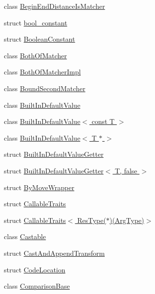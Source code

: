 \begin{DoxyCompactItemize}
\item 
class \hyperlink{classtesting_1_1internal_1_1_begin_end_distance_is_matcher}{Begin\+End\+Distance\+Is\+Matcher}
\item 
struct \hyperlink{structtesting_1_1internal_1_1bool__constant}{bool\+\_\+constant}
\item 
struct \hyperlink{structtesting_1_1internal_1_1_boolean_constant}{Boolean\+Constant}
\item 
class \hyperlink{classtesting_1_1internal_1_1_both_of_matcher}{Both\+Of\+Matcher}
\item 
class \hyperlink{classtesting_1_1internal_1_1_both_of_matcher_impl}{Both\+Of\+Matcher\+Impl}
\item 
class \hyperlink{classtesting_1_1internal_1_1_bound_second_matcher}{Bound\+Second\+Matcher}
\item 
class \hyperlink{classtesting_1_1internal_1_1_built_in_default_value}{Built\+In\+Default\+Value}
\item 
class \hyperlink{classtesting_1_1internal_1_1_built_in_default_value_3_01const_01_t_01_4}{Built\+In\+Default\+Value$<$ const T $>$}
\item 
class \hyperlink{classtesting_1_1internal_1_1_built_in_default_value_3_01_t_01_5_01_4}{Built\+In\+Default\+Value$<$ T $\ast$ $>$}
\item 
struct \hyperlink{structtesting_1_1internal_1_1_built_in_default_value_getter}{Built\+In\+Default\+Value\+Getter}
\item 
struct \hyperlink{structtesting_1_1internal_1_1_built_in_default_value_getter_3_01_t_00_01false_01_4}{Built\+In\+Default\+Value\+Getter$<$ T, false $>$}
\item 
struct \hyperlink{structtesting_1_1internal_1_1_by_move_wrapper}{By\+Move\+Wrapper}
\item 
struct \hyperlink{structtesting_1_1internal_1_1_callable_traits}{Callable\+Traits}
\item 
struct \hyperlink{structtesting_1_1internal_1_1_callable_traits_3_01_res_type_07_5_08_07_arg_type_08_4}{Callable\+Traits$<$ Res\+Type($\ast$)(\+Arg\+Type)$>$}
\item 
class \hyperlink{classtesting_1_1internal_1_1_castable}{Castable}
\item 
struct \hyperlink{structtesting_1_1internal_1_1_cast_and_append_transform}{Cast\+And\+Append\+Transform}
\item 
struct \hyperlink{structtesting_1_1internal_1_1_code_location}{Code\+Location}
\item 
class \hyperlink{classtesting_1_1internal_1_1_comparison_base}{Comparison\+Base}

\end{DoxyCompactItemize}
